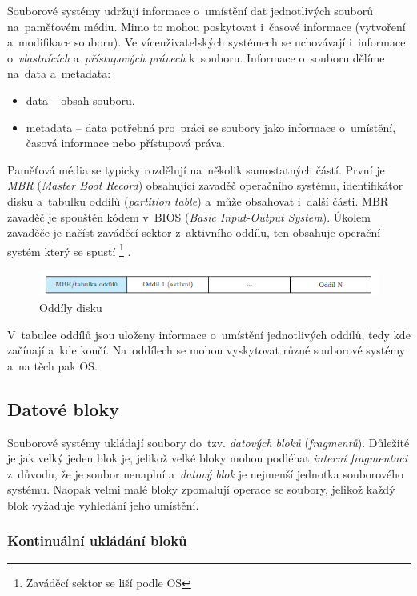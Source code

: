 Souborové systémy udržují informace o~umístění dat jednotlivých souborů na~paměťovém médiu. Mimo to mohou poskytovat i~časové informace (vytvoření a~modifikace souboru). Ve víceuživatelských systémech se uchovávají i~informace o~\emph{vlastnících} a~\emph{přístupových právech} k~souboru. Informace o~souboru dělíme na~data a~metadata:

\begin{itemize}
	\item data -- obsah souboru.
	\item metadata -- data potřebná pro~práci se soubory jako informace o~umístění, časová informace nebo přístupová práva.
\end{itemize}

Paměťová média se typicky rozdělují na~několik samostatných částí. První je \emph{MBR} (\emph{Master Boot Record}) obsahující zavaděč operačního systému, identifikátor disku a~tabulku oddílů (\emph{partition table}) a~může obsahovat i~další části. MBR zavaděč je spouštěn kódem v~BIOS (\emph{Basic Input-Output System}). Úkolem zavaděče je načíst zaváděcí sektor z~aktivního oddílu, ten obsahuje operační systém který se spustí%
\footnote{Zaváděcí sektor se liší podle OS}%
.

\begin{figure}[ht]
	\centering
	\includegraphics[scale=1]{images/mem_partitions.png}
	\caption{Oddíly disku}
	\label{mem_partitions}
\end{figure}

V~tabulce oddílů jsou uloženy informace o~umístění jednotlivých oddílů, tedy kde začínají a~kde končí. Na~oddílech se mohou vyskytovat různé souborové systémy a~na těch pak OS.

\subsection{Datové bloky}

Souborové systémy ukládají soubory do~tzv. \emph{datových bloků} (\emph{fragmentů}). Důležité je jak velký jeden blok je, jelikož velké bloky mohou podléhat \emph{interní fragmentaci} z~důvodu, že je soubor nenaplní a~\emph{datový blok} je nejmenší jednotka souborového systému. Naopak velmi malé bloky zpomalují operace se soubory, jelikož každý blok vyžaduje vyhledání jeho umístění.

\subsubsection{Kontinuální ukládání bloků}

